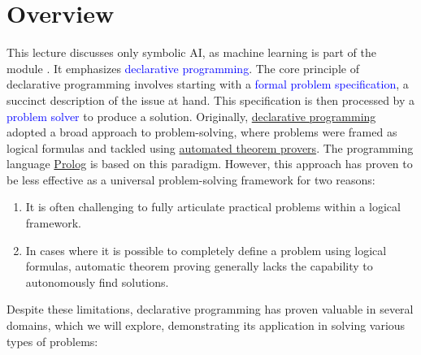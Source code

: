 \section{Overview}
This lecture discusses only symbolic AI, as machine learning is part of the module .  
It emphasizes \textcolor{blue}{declarative programming}. The core principle of declarative programming
involves starting with a \textcolor{blue}{formal problem 
specification}, a succinct description of the issue at hand. This specification is then processed by a
\textcolor{blue}{problem solver} to produce a solution. Originally,
\href{https://en.wikipedia.org/wiki/Declarative_programming}{declarative programming} adopted a broad
approach to problem-solving, where problems were framed as logical formulas and tackled using
\href{https://en.wikipedia.org/wiki/Automated_theorem_proving}{automated theorem provers}. The
programming language \href{https://en.wikipedia.org/wiki/Prolog}{Prolog} is based on this
paradigm. However, this approach has proven to be less effective as a universal problem-solving framework
for two reasons: 
\begin{enumerate}
\item It is often challenging to fully articulate practical problems within a logical framework.
\item In cases where it is possible to completely define a problem using logical formulas, automatic
       theorem proving generally lacks the capability to autonomously find solutions. 
\end{enumerate}
Despite these limitations, declarative programming has proven valuable in several domains, which we will
explore, demonstrating its application in solving various types of problems: 
